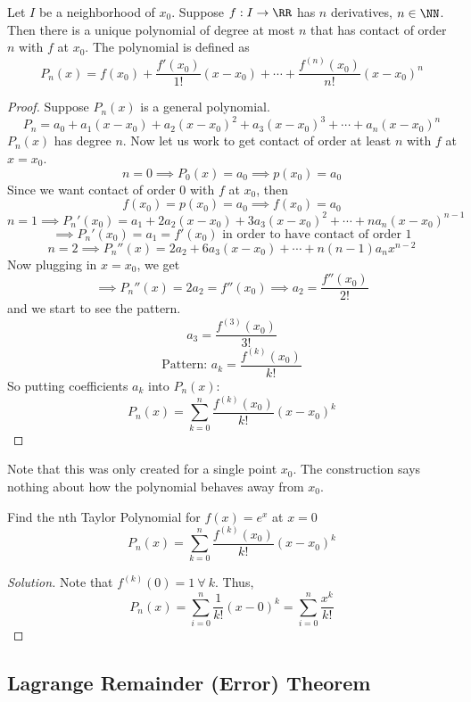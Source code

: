 \documentclass[12pt]{scrartcl}
\begin{document}
\begin{theorem}
  Let $I$ be a neighborhood of $x_0$. Suppose $f: I \to \RR$ has $n$ derivatives, $n \in \NN$. 
  Then there is a unique polynomial of degree at most $n$ that has contact of order $n$ with 
  $f$ at $x_0$. The polynomial is defined as 
  \[P_{n}(x) = f(x_0) + \frac{f'(x_0)}{1!}(x - x_0) + \cdots + \frac{f^{(n)}(x_0)}{n!}(x - x_0)^n\]

  \begin{proof}
    
  \hfill

  Suppose $P_n(x)$ is a general polynomial.
  \[P_n = a_0 + a_1(x - x_0) + a_2(x - x_0)^2 + a_3(x-x_0)^3 + \cdots + a_n(x - x_0)^n\]
  $P_n(x)$ has degree $n$. Now let us work to get contact of order at least $n$ with $f$ at $x=x_0$.
  \[n = 0 \implies P_0(x) = a_0 \implies p(x_0) = a_0\]
  Since we want contact of order $0$ with $f$ at $x_0$, then 
  \[f(x_0) = p(x_0) = a_0 \implies f(x_0) = a_0\]
  \[n = 1 \implies P_n'(x_0) = a_1 + 2a_2(x-x_0) + 3a_3(x-x_0)^2 + \cdots + na_n(x-x_0)^{n-1}\]
  \[\implies P_n'(x_0) = a_1 = f'(x_0) \text{ in order to have contact of order 1}\]
  \[n = 2 \implies P_n''(x) = 2a_2 + 6a_3(x-x_0) + \cdots + n(n-1)a_n x^{n-2}\]
  Now plugging in $x=x_0$, we get
  \[\implies P_n''(x) = 2a_2 = f''(x_0) \implies a_2 = \frac{f''(x_0)}{2!}\]
  and we start to see the pattern.
  \[a_3 = \frac{f^{(3)}(x_0)}{3!}\]
  \[\text{Pattern: } a_k = \frac{f^{(k)}(x_0)}{k!}\]
  So putting coefficients $a_k$ into $P_n(x)$:
  \[P_n(x) = \sum_{k=0}^n \frac{f^{(k)}(x_0)}{k!}(x-x_0)^k\]
  \end{proof}
\end{theorem}

\begin{note}
  Note that this was only created for a single point $x_0$. The construction says nothing about 
  how the polynomial behaves away from $x_0$. 
\end{note}

\begin{example}
  Find the nth Taylor Polynomial for $f(x) = e^x$ at $x=0$
  \[P_n(x) = \sum_{k=0}^n \frac{f^{(k)}(x_0)}{k!}(x-x_0)^k\]

  \begin{proof}[Solution]
    Note that $f^{(k)}(0) = 1 \ \forall \ k$. Thus, 
    \[P_n(x) = \sum_{i=0}^n \frac{1}{k!}(x-0)^k = \sum_{i=0}^n \frac{x^k}{k!}\]
  \end{proof}
\end{example}

\subsection{Lagrange Remainder (Error) Theorem}
\end{document}
